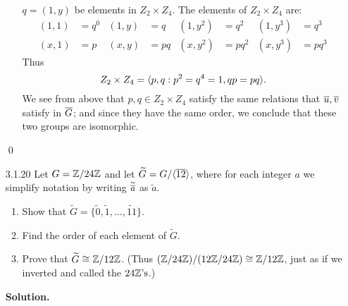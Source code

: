 \begin{enumerate}
\begin{enumerate}
               $q = (1, y)$ be elements in $Z_2 \times Z_4$. The elements of
               $Z_2 \times Z_4$ are:
               \begin{align*}
                  (1, 1) &= q^0 & (1, y) &= q &
                     (1, y^2) &= q^2 & (1, y^3) &= q^3 \\
                  (x, 1) &= p & (x, y) &= pq &
                     (x, y^2) &= pq^2 & (x, y^3) &= pq^3
               \end{align*}
               Thus
               $$Z_2 \times Z_4 = \langle p , q: p^2 = q^4 = 1, qp = pq \rangle.$$
               We see from above that $p, q \in Z_2 \times Z_4$ satisfy the same
               relations that $\overline{u}, \overline{v}$ satisfy in $\overline{G}$; and since they
               have the same order, we conclude that these two groups are 
               isomorphic.
      \end{enumerate} \qed
   \item[3.1.20]  Let $G = \mathbb{Z}/24\mathbb{Z}$ and let
                  $\widetilde{G} = G/\langle \overline{12} \rangle$, where for each integer $a$
                  we simplify notation by writing $\widetilde{\overline{a}}$ as
                  $\widetilde{a}$.
                  \begin{enumerate}
                     \item Show that $\widetilde{G} = \{\widetilde{0},
                           \widetilde{1}, \ldots, \widetilde{11}\}$.
                     \item Find the order of each element of $\widetilde{G}$.
                     \item Prove that $\widetilde{G} \cong \mathbb{Z}/12\mathbb{Z}$. (Thus
                           $(\mathbb{Z}/24\mathbb{Z})/(12\mathbb{Z}/24\mathbb{Z}) \cong \mathbb{Z}/12\mathbb{Z}$, just as if we
                           inverted and called the $24\mathbb{Z}\text{'s}$.)
                  \end{enumerate}

      \textbf{Solution.}


\end{enumerate}
